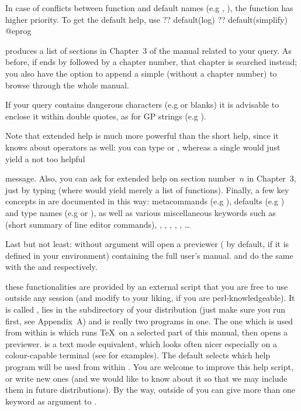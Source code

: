 In case of conflicts between function and default names (e.g ,
), the function has higher priority. To get the default help,
use 
\bprog
  ?? default(log)
  ?? default(simplify)
@eprog

 produces a list of sections in Chapter~3 of the
manual related to your query. As before, if  ends by 
followed by a chapter number, that chapter is searched instead; you also
have the option to append a simple  (without a chapter number) to
browse through the whole manual.

If your query contains dangerous characters (e.g  or blanks) it is
advisable to enclose it within double quotes, as for GP strings (e.g
).

Note that extended help is much more powerful than the short help, since
it knows about operators as well: you can type  or
, whereas a single  would just yield a not too helpful


\noindent message. Also, you can ask for extended help on section
number~$n$ in Chapter~3, just by typing  (where  would
yield merely a list of functions). Finally, a few key concepts in  are
documented in this way: metacommands (e.g ), defaults (e.g
) and type names (e.g  or ), as well as
various miscellaneous keywords such as  (short summary of line
editor commands), , , ,
, , \dots

Last but not least:  without argument will open a 
previewer ( by default,  if it is defined in your
environment) containing the full user's manual.  and
 do the same with the  and 
respectively.

 these functionalities are provided by an
external  script that you are free to use outside any  session
(and modify to your liking, if you are perl-knowledgeable). It is called
, lies in the  subdirectory of your distribution
(just make sure you run  first, see Appendix~A) and is
really two programs in one. The one which is used from within  is
 which runs \TeX\ on a selected part of this manual, then opens
a previewer.  is a text mode equivalent, which looks
often nicer especially on a colour-capable terminal (see
 for examples). The default  selects which
help program will be used from within . You are welcome to improve this
help script, or write new ones (and we would like to know about it
so that we may include them in future distributions). By the way, outside
of  you can give more than one keyword as argument to .

